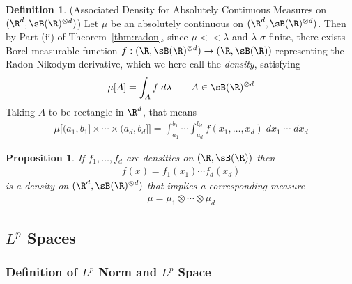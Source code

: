 \documentclass[12pt]{article}
\theoremstyle{plain}
\newtheorem{prop}[thm]{Proposition}
\theoremstyle{definition}
\newtheorem{defn}[thm]{Definition}
\theoremstyle{remark}
\newcommand{\ra}{\rightarrow}
\begin{document}
\begin{defn}
(Associated Density for Absolutely Continuous Measures on $(\R^d,\sB(\R)^{\otimes d})$)
Let $\mu$ be an absolutely continuous on $(\R^d,\sB(\R)^{\otimes d})$.
Then by Part (ii) of Theorem~\ref{thm:radon}, since $\mu<<\lambda$ and
$\lambda$ $\sigma$-finite, there exists Borel measurable function
$f:(\R,\sB(\R)^{\otimes d})\ra(\R,\sB(\R))$
representing the Radon-Nikodym derivative, which we here call the
\emph{density}, satisfying
\begin{align*}
  \mu[A]
  = \int_A f \; d\lambda
  \qquad A\in \sB(\R)^{\otimes d}
\end{align*}
Taking $A$ to be rectangle in $\R^d$, that means
\begin{align*}
  \mu\big[
    (a_1,b_1] \times\cdots\times (a_d,b_d]
  \big]
  =
  \int_{a_1}^{b_1}
  \cdots
  \int_{a_d}^{b_d}
  f(x_1,\ldots,x_d)\;
  dx_1\;\cdots \;dx_d
\end{align*}
\end{defn}


\begin{prop}
\label{prop:densityproduct}
If $f_1,\ldots,f_d$ are densities on $(\R,\sB(\R))$ then
\begin{align*}
  f(x) = f_1(x_1) \cdots f_d(x_d)
\end{align*}
is a density on $(\R^d,\sB(\R)^{\otimes d})$ that implies a
corresponding measure
\begin{align*}
  \mu = \mu_1\otimes \cdots \otimes \mu_d
\end{align*}
\end{prop}




\clearpage
\subsection{$L^p$ Spaces}

\subsubsection{Definition of $L^p$ Norm and $L^p$ Space}
\end{document}
